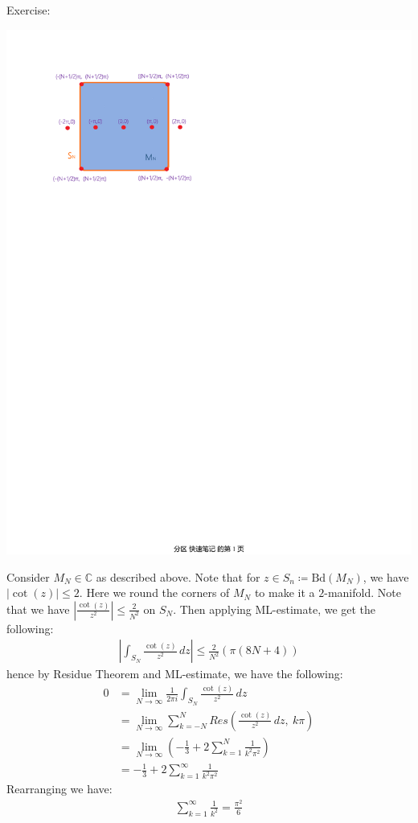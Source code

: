 \documentclass[15pt]{book}
\theoremstyle{break}
\theoremstyle{break}
\newcommand{\Bd}{\text{Bd}}
\newcommand{\Complex}{\mathbb{C}}
\newcommand{\exercise}{\color{green}Exercise: \color{black}}
\begin{document}
\newpage
\exercise
\begin{center}
\includegraphics[scale=0.8]{MNSN.pdf}
\end{center}
Consider $M_N \in \Complex$ as described above. Note that for $z \in S_n \coloneqq \Bd(M_N)$,  we have $|\cot(z)|\leq 2$. Here we round the corners of $M_N$ to make it a $2$-manifold. Note that we have $|\frac{\cot(z)}{z^2}|\leq \frac{2}{N^2}$ on $S_N$. Then applying ML-estimate, we get the following:
\begin{align*}
\left| \int_{S_N}\frac{\cot(z)}{z^2}\, dz \right| \leq \frac{2}{N^2} \left( \pi (8N+4)\right)
\end{align*}
hence by Residue Theorem and ML-estimate, we have the following:
\begin{align*}
0&=\lim_{N\to \infty} \frac{1}{2\pi i}\int_{S_N}\frac{\cot(z)}{z^2}\, dz \\
&= \lim_{N\to \infty}\sum_{k=-N}^{N}Res\left( \frac{\cot(z)}{z^2}\, dz,\ k\pi\right) \\
&= \lim_{N\to \infty}\left( -\frac{1}{3}+ 2\sum_{k=1}^N \frac{1}{k^2 \pi^2}\right) \\
&= -\frac{1}{3}+2\sum_{k=1}^{\infty}\frac{1}{k^2 \pi^2}
\end{align*}
Rearranging we have:
\begin{align*}
\sum_{k=1}^\infty \frac{1}{k^2} = \frac{\pi^2}{6}
\end{align*}
\end{document}
